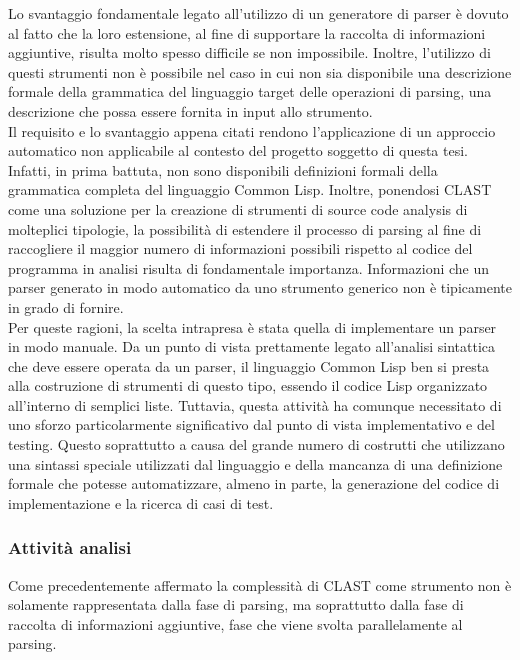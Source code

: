 Lo svantaggio fondamentale legato all'utilizzo di un generatore di parser è
dovuto al fatto che la loro estensione, al fine di supportare la raccolta di
informazioni aggiuntive, risulta molto spesso difficile se non impossibile.
Inoltre, l’utilizzo di questi strumenti non è possibile nel caso in cui non sia
disponibile una descrizione formale della grammatica del linguaggio target delle
operazioni di parsing, una descrizione che possa essere fornita in input allo
strumento.\\

Il requisito e lo svantaggio appena citati rendono l’applicazione di un
approccio automatico non applicabile al contesto del progetto soggetto di questa
tesi. Infatti, in prima battuta, non sono disponibili definizioni formali della
grammatica completa del linguaggio Common Lisp. Inoltre, ponendosi CLAST come
una soluzione per la creazione di strumenti di source code analysis di
molteplici tipologie, la possibilità di estendere il processo di parsing al fine
di raccogliere il maggior numero di informazioni possibili rispetto al codice
del programma in analisi risulta di fondamentale importanza. Informazioni che un
parser generato in modo automatico da uno strumento generico non è tipicamente
in grado di fornire.\\

Per queste ragioni, la scelta intrapresa è stata quella di implementare un
parser in modo manuale. Da un punto di vista prettamente legato all’analisi
sintattica che deve essere operata da un parser, il linguaggio Common Lisp ben
si presta alla costruzione di strumenti di questo tipo, essendo il codice Lisp
organizzato all’interno di semplici liste. Tuttavia, questa attività ha comunque
necessitato di uno sforzo particolarmente significativo dal punto di vista
implementativo e del testing. Questo soprattutto a causa del grande numero di
costrutti che utilizzano una sintassi speciale utilizzati dal linguaggio e della
mancanza di una definizione formale che potesse automatizzare, almeno in parte,
la generazione del codice di implementazione e la ricerca di casi di test.

\subsubsection{Attività analisi}

Come precedentemente affermato la complessità di CLAST come strumento non è
solamente rappresentata dalla fase di parsing, ma soprattutto dalla fase di
raccolta di informazioni aggiuntive, fase che viene svolta parallelamente al
parsing.

